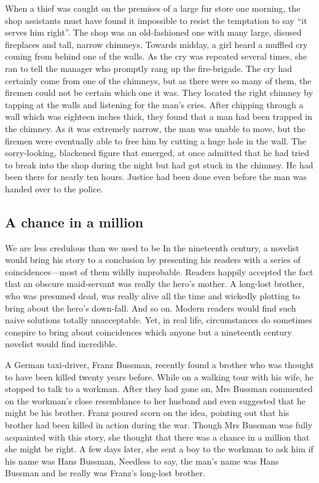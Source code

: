 \documentclass[11pt]{article}
\begin{document}
When a thief was caught on the premises of a large fur store one morning, the shop assistants must have found it impossible to resist the temptation to say ``it serves him right''. The shop was an old-fashioned one with many large, disused fireplaces and tall, narrow chimneys. Towards midday, a girl heard a muffled cry coming from behind one of the walls. As the cry was repeated several times, she ran to tell the manager who promptly rang up the fire-brigade. The cry had certainly come from one of the chimneys, but as there were so many of them, the firemen could not be certain which one it was. They located the right chimney by tapping at the walls and listening for the man's cries. After chipping through a wall which was eighteen inches thick, they found that a man had been trapped in the chimney. As it was extremely narrow, the man was unable to move, but the firemen were eventually able to free him by cutting a huge hole in the wall. The sorry-looking, blackened figure that emerged, at once admitted that he had tried to break into the shop during the night but had got stuck in the chimney. He had been there for nearly ten hours. Justice had been done even before the man was handed over to the police. 
\subsection{A chance in a million}
\label{sec-1-36}

We are less credulous than we used to be In the nineteenth century, a novelist would bring his story to a conclusion by presenting his readers with a series of coincidences---most of them wildly improbable. Readers happily accepted the fact that an obscure maid-servant was really the hero's mother. A long-lost brother, who was presumed dead, was really alive all the time and wickedly plotting to bring about the hero's down-fall. And so on. Modern readers would find such naive solutions totally unacceptable. Yet, in real life, circumstances do sometimes conspire to bring about coincidences which anyone but a nineteenth century novelist would find incredible.

A German taxi-driver, Franz Bussman, recently found a brother who was thought to have been killed twenty years before. While on a walking tour with his wife, he stopped to talk to a workman. After they had gone on, Mrs Bussman commented on the workman's close resemblance to her husband and even suggested that he might be his brother. Franz poured scorn on the idea, pointing out that his brother had been killed in action during the war. Though Mrs Bussman was fully acquainted with this story, she thought that there was a chance in a million that she might be right. A few days later, she sent a boy to the workman to ask him if his name was Hans Bussman, Needless to say, the man's name was Hans Bussman and he really was Franz's long-lost brother.
\end{document}
